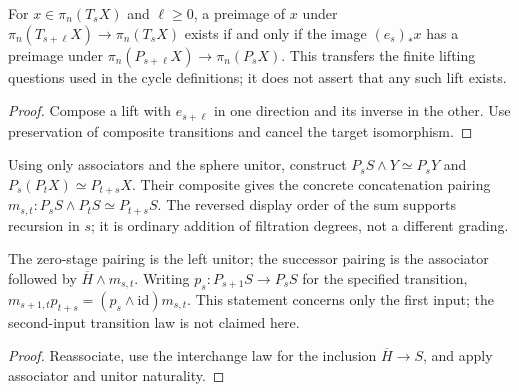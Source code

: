 \begin{proposition}
  \label{prop:h6-smash-liftability}
  \leanok
  For $x\in\pi_n(T_sX)$ and $\ell\ge0$, a preimage of $x$ under
  $\pi_n(T_{s+\ell}X)\to\pi_n(T_sX)$ exists if and only if the image
  $(e_s)_*x$ has a preimage under
  $\pi_n(P_{s+\ell}X)\to\pi_n(P_sX)$.
  This transfers the finite lifting questions used in the cycle definitions;
  it does not assert that any such lift exists.
\end{proposition}
\begin{proof}
  Compose a lift with $e_{s+\ell}$ in one direction and its inverse in the
  other. Use preservation of composite transitions and cancel the target
  isomorphism.
  \leanok
\end{proof}

\begin{definition}
  \label{def:h6-smash-sphere-pairing}
  \leanok
  Using only associators and the sphere unitor, construct
  $P_sS\wedge Y\simeq P_sY$ and $P_s(P_tX)\simeq P_{t+s}X$.
  Their composite gives the concrete concatenation pairing
  $m_{s,t}:P_sS\wedge P_tS\simeq P_{t+s}S$.
  The reversed display order of the sum supports recursion in $s$; it is
  ordinary addition of filtration degrees, not a different grading.
\end{definition}

\begin{proposition}
  \label{prop:h6-smash-pairing-left-transition}
  \leanok
  The zero-stage pairing is the left unitor; the successor pairing is the
  associator followed by $\overline H\wedge m_{s,t}$.
  Writing $p_s:P_{s+1}S\to P_sS$ for the specified transition,
  $m_{s+1,t}p_{t+s}=(p_s\wedge\mathrm{id})m_{s,t}$.
  This statement concerns only the first input; the second-input transition
  law is not claimed here.
\end{proposition}
\begin{proof}
  Reassociate, use the interchange law for the inclusion
  $\overline H\to S$, and apply associator and unitor naturality.
  \leanok
\end{proof}

